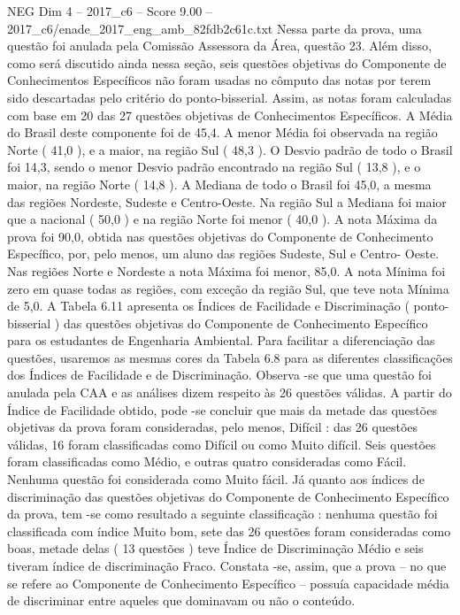 \begin{textsample}{NEG Dim 4 – 2017\_c6 – Score 9.00 – 2017\_c6/enade\_2017\_eng\_amb\_82fdb2c61c.txt}
Nessa parte da prova, uma questão foi anulada pela Comissão Assessora da Área, questão 23.
Além disso, como será discutido ainda nessa seção, seis questões objetivas do Componente de Conhecimentos Específicos não foram usadas no cômputo das notas por terem sido descartadas pelo critério do ponto-bisserial.
Assim, as notas foram calculadas com base em 20 das 27 questões objetivas de Conhecimentos Específicos.
A Média do Brasil deste componente foi de 45,4.
A menor Média foi observada na região Norte ( 41,0 ), e a maior, na região Sul ( 48,3 ).
O Desvio padrão de todo o Brasil foi 14,3, sendo o menor Desvio padrão encontrado na região Sul ( 13,8 ), e o maior, na região Norte ( 14,8 ).
A Mediana de todo o Brasil foi 45,0, a mesma das regiões Nordeste, Sudeste e Centro-Oeste.
Na região Sul a Mediana foi maior que a nacional ( 50,0 ) e na região Norte foi menor ( 40,0 ).
A nota Máxima da prova foi 90,0, obtida nas questões objetivas do Componente de Conhecimento Específico, por, pelo menos, um aluno das regiões Sudeste, Sul e Centro- Oeste.
Nas regiões Norte e Nordeste a nota Máxima foi menor, 85,0.
A nota Mínima foi zero em quase todas as regiões, com exceção da região Sul, que teve nota Mínima de 5,0.
A Tabela 6.11 apresenta os Índices de Facilidade e Discriminação ( ponto-bisserial ) das questões objetivas do Componente de Conhecimento Específico para os estudantes de Engenharia Ambiental.
Para facilitar a diferenciação das questões, usaremos as mesmas cores da Tabela 6.8 para as diferentes classificações dos Índices de Facilidade e de Discriminação.
Observa -se que uma questão foi anulada pela CAA e as análises dizem respeito às 26 questões válidas.
A partir do Índice de Facilidade obtido, pode -se concluir que mais da metade das questões objetivas da prova foram consideradas, pelo menos, Difícil : das 26 questões válidas, 16 foram classificadas como Difícil ou como Muito difícil.
Seis questões foram classificadas como Médio, e outras quatro consideradas como Fácil.
Nenhuma questão foi considerada como Muito fácil.
Já quanto aos índices de discriminação das questões objetivas do Componente de Conhecimento Específico da prova, tem -se como resultado a seguinte classificação : nenhuma questão foi classificada com índice Muito bom, sete das 26 questões foram consideradas como boas, metade delas ( 13 questões ) teve Índice de Discriminação Médio e seis tiveram índice de discriminação Fraco.
Constata -se, assim, que a prova – no que se refere ao Componente de Conhecimento Específico – possuía capacidade média de discriminar entre aqueles que dominavam ou não o conteúdo.

\end{textsample}
